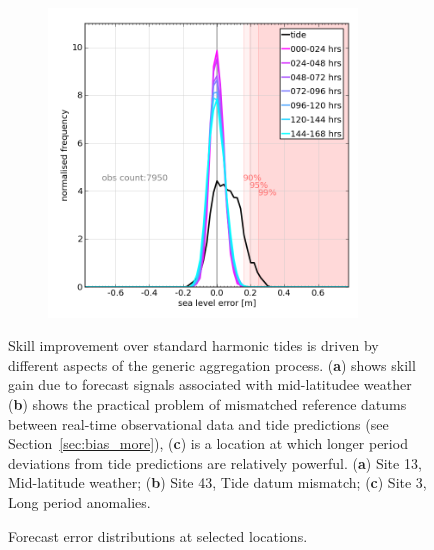 \begin{figure}[!hbt]
\begin{subfigure}{0.30\textwidth}
    \caption{}
    \end{subfigure}
    \begin{subfigure}{0.30\textwidth}
    \includegraphics[width=0.9\textwidth]{figures/plots/0003_verify_pdf.png}
    \caption{}
    \end{subfigure}
    \caption{Forecast error distributions at selected locations.}
    {Skill improvement over standard harmonic tides is driven by different aspects of the generic aggregation process. (\textbf{a}) shows skill gain due to forecast signals associated with mid-latitudee weather (\textbf{b}) shows the practical problem of mismatched reference datums between real-time observational data and tide predictions (see Section~\ref{sec:bias_more}), (\textbf{c}) is a location at which longer period deviations from tide predictions are relatively powerful. (\textbf{a}) Site 13, Mid-latitude weather; (\textbf{b}) Site 43, Tide datum mismatch; (\textbf{c}) Site 3, Long period anomalies.}

    \label{fig:pdf}
\end{figure}   


